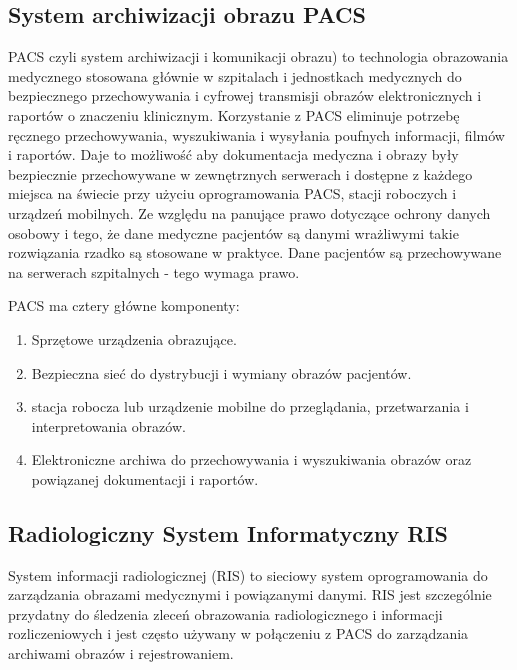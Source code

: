 \documentclass[a4paper,11pt,twoside]{report}
\theoremstyle{definition}
\begin{document}
\subsection{System archiwizacji obrazu PACS}
PACS czyli system archiwizacji i komunikacji obrazu) to technologia obrazowania medycznego stosowana głównie w szpitalach i jednostkach medycznych do bezpiecznego przechowywania i cyfrowej transmisji obrazów elektronicznych i raportów o znaczeniu klinicznym. Korzystanie z PACS eliminuje potrzebę ręcznego przechowywania, wyszukiwania i wysyłania poufnych informacji, filmów i raportów. Daje to możliwość aby dokumentacja medyczna i obrazy były bezpiecznie przechowywane w zewnętrznych serwerach i dostępne z każdego miejsca na świecie przy użyciu oprogramowania PACS, stacji roboczych i urządzeń mobilnych. Ze względu na panujące prawo dotyczące ochrony danych osobowy i tego, że dane medyczne pacjentów są danymi wrażliwymi takie rozwiązania rzadko są stosowane w praktyce. Dane pacjentów są przechowywane na serwerach szpitalnych - tego wymaga prawo.
\par
PACS ma cztery główne komponenty: 
\begin{enumerate}
	\item Sprzętowe urządzenia obrazujące.
	\item Bezpieczna sieć do dystrybucji i wymiany obrazów pacjentów.
	\item stacja robocza lub urządzenie mobilne do przeglądania, przetwarzania i interpretowania obrazów.
	\item Elektroniczne archiwa do przechowywania i wyszukiwania obrazów oraz powiązanej dokumentacji i raportów.
\end{enumerate}

\subsection{Radiologiczny System Informatyczny RIS}
System informacji radiologicznej (RIS) to sieciowy system oprogramowania do zarządzania obrazami medycznymi i powiązanymi danymi. RIS jest szczególnie przydatny do śledzenia zleceń obrazowania radiologicznego i informacji rozliczeniowych i jest często używany w połączeniu z PACS do zarządzania archiwami obrazów i rejestrowaniem.
\end{document}
